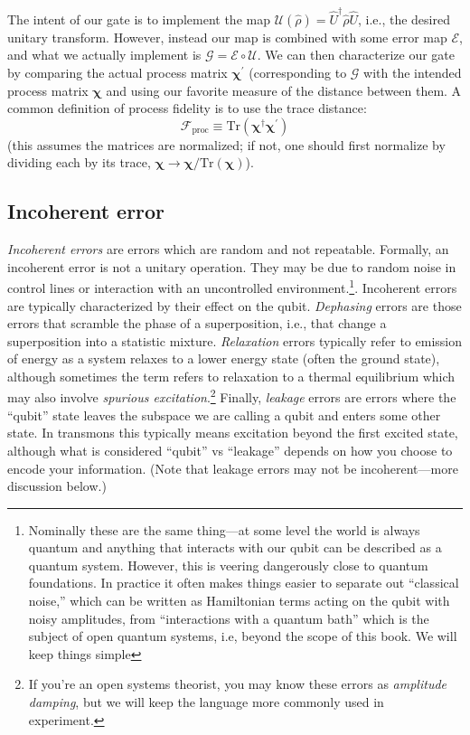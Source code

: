 The intent of our gate is to implement the map $\mathcal{U}(\hat{\rho}) = \hat{U}^\dag \hat{\rho} \hat{U}$, i.e., the desired unitary transform. However, instead our map is combined with some error map $\mathcal{E}$, and what we actually implement is $\mathcal{G} = \mathcal{E} \circ\mathcal{U}$. We can then characterize our gate by comparing the actual process matrix $\bm{\chi^\prime}$ (corresponding to $\mathcal{G}$ with the intended process matrix $\bm{\chi}$ and using our favorite measure of the distance between them. A common definition of process fidelity is to use the trace distance:
\begin{equation}
    \mathcal{F}_\mathrm{proc} \equiv \mathrm{Tr}(\bm{\chi}^\dag \bm{\chi^\prime})
\end{equation}
(this assumes the matrices are normalized; if not, one should first normalize by dividing each by its trace, $\bm{\chi}\rightarrow\bm{\chi}/\mathrm{Tr}(\bm{\chi})$). 


\subsection{Incoherent error}
\textit{Incoherent errors} are errors which are random and not repeatable. Formally, an incoherent error is not a unitary operation. They may be due to random noise in control lines or interaction with an uncontrolled environment.\footnote{Nominally these are the same thing---at some level the world is always quantum and anything that interacts with our qubit can be described as a quantum system. However, this is veering dangerously close to quantum foundations. In practice it often makes things easier to separate out ``classical noise,'' which can be written as Hamiltonian terms acting on the qubit with noisy amplitudes, from ``interactions with a quantum bath'' which is the subject of open quantum systems, i.e, beyond the scope of this book. We will keep things simple}. Incoherent errors are typically characterized by their effect on the qubit. \textit{Dephasing} errors are those errors that scramble the phase of a superposition, i.e., that change a superposition into a statistic mixture. \textit{Relaxation} errors typically refer to emission of energy as a system relaxes to a lower energy state (often the ground state), although sometimes the term refers to relaxation to a thermal equilibrium which may also involve \textit{spurious excitation}.\footnote{If you're an open systems theorist, you may know these errors as \textit{amplitude damping}, but we will keep the language more commonly used in experiment.} Finally, \textit{leakage} errors are errors where the ``qubit'' state leaves the subspace we are calling a qubit and enters some other state. In transmons this typically means excitation beyond the first excited state, although what is considered ``qubit'' vs ``leakage'' depends on how you choose to encode your information. (Note that leakage errors may not be incoherent---more discussion below.)

